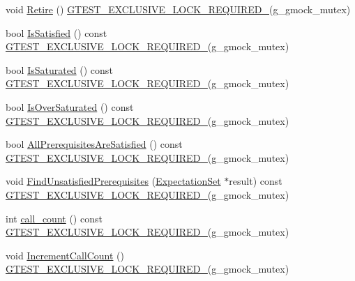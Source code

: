 \begin{DoxyCompactItemize}
void \hyperlink{classtesting_1_1internal_1_1_expectation_base_a0aeeb4c1e66c2f2aa0853c267ad3e781}{Retire} () \hyperlink{gtest-port_8h_a149f693bd59fa1bc937af54c0cdcb32f}{G\+T\+E\+S\+T\+\_\+\+E\+X\+C\+L\+U\+S\+I\+V\+E\+\_\+\+L\+O\+C\+K\+\_\+\+R\+E\+Q\+U\+I\+R\+E\+D\+\_\+}(g\+\_\+gmock\+\_\+mutex)
\item 
bool \hyperlink{classtesting_1_1internal_1_1_expectation_base_ae629adc2dd9aee0ac62e50314f1a6449}{Is\+Satisfied} () const \hyperlink{gtest-port_8h_a149f693bd59fa1bc937af54c0cdcb32f}{G\+T\+E\+S\+T\+\_\+\+E\+X\+C\+L\+U\+S\+I\+V\+E\+\_\+\+L\+O\+C\+K\+\_\+\+R\+E\+Q\+U\+I\+R\+E\+D\+\_\+}(g\+\_\+gmock\+\_\+mutex)
\item 
bool \hyperlink{classtesting_1_1internal_1_1_expectation_base_ad3e4340cedefdc24fce1478a8d6cab93}{Is\+Saturated} () const \hyperlink{gtest-port_8h_a149f693bd59fa1bc937af54c0cdcb32f}{G\+T\+E\+S\+T\+\_\+\+E\+X\+C\+L\+U\+S\+I\+V\+E\+\_\+\+L\+O\+C\+K\+\_\+\+R\+E\+Q\+U\+I\+R\+E\+D\+\_\+}(g\+\_\+gmock\+\_\+mutex)
\item 
bool \hyperlink{classtesting_1_1internal_1_1_expectation_base_a080dab35ecc6c57096f50758a0e8123d}{Is\+Over\+Saturated} () const \hyperlink{gtest-port_8h_a149f693bd59fa1bc937af54c0cdcb32f}{G\+T\+E\+S\+T\+\_\+\+E\+X\+C\+L\+U\+S\+I\+V\+E\+\_\+\+L\+O\+C\+K\+\_\+\+R\+E\+Q\+U\+I\+R\+E\+D\+\_\+}(g\+\_\+gmock\+\_\+mutex)
\item 
bool \hyperlink{classtesting_1_1internal_1_1_expectation_base_a82ba68cdd71a8b5aff5a5be24c23a637}{All\+Prerequisites\+Are\+Satisfied} () const \hyperlink{gtest-port_8h_a149f693bd59fa1bc937af54c0cdcb32f}{G\+T\+E\+S\+T\+\_\+\+E\+X\+C\+L\+U\+S\+I\+V\+E\+\_\+\+L\+O\+C\+K\+\_\+\+R\+E\+Q\+U\+I\+R\+E\+D\+\_\+}(g\+\_\+gmock\+\_\+mutex)
\item 
void \hyperlink{classtesting_1_1internal_1_1_expectation_base_a9eb518c079f950a59c67e8012d3371c0}{Find\+Unsatisfied\+Prerequisites} (\hyperlink{classtesting_1_1_expectation_set}{Expectation\+Set} $\ast$result) const \hyperlink{gtest-port_8h_a149f693bd59fa1bc937af54c0cdcb32f}{G\+T\+E\+S\+T\+\_\+\+E\+X\+C\+L\+U\+S\+I\+V\+E\+\_\+\+L\+O\+C\+K\+\_\+\+R\+E\+Q\+U\+I\+R\+E\+D\+\_\+}(g\+\_\+gmock\+\_\+mutex)
\item 
int \hyperlink{classtesting_1_1internal_1_1_expectation_base_aacc0399271907194ac1627439f65047a}{call\+\_\+count} () const \hyperlink{gtest-port_8h_a149f693bd59fa1bc937af54c0cdcb32f}{G\+T\+E\+S\+T\+\_\+\+E\+X\+C\+L\+U\+S\+I\+V\+E\+\_\+\+L\+O\+C\+K\+\_\+\+R\+E\+Q\+U\+I\+R\+E\+D\+\_\+}(g\+\_\+gmock\+\_\+mutex)
\item 
void \hyperlink{classtesting_1_1internal_1_1_expectation_base_aef1766c39ad6478f9041e0f5c5000532}{Increment\+Call\+Count} () \hyperlink{gtest-port_8h_a149f693bd59fa1bc937af54c0cdcb32f}{G\+T\+E\+S\+T\+\_\+\+E\+X\+C\+L\+U\+S\+I\+V\+E\+\_\+\+L\+O\+C\+K\+\_\+\+R\+E\+Q\+U\+I\+R\+E\+D\+\_\+}(g\+\_\+gmock\+\_\+mutex)

\end{DoxyCompactItemize}
